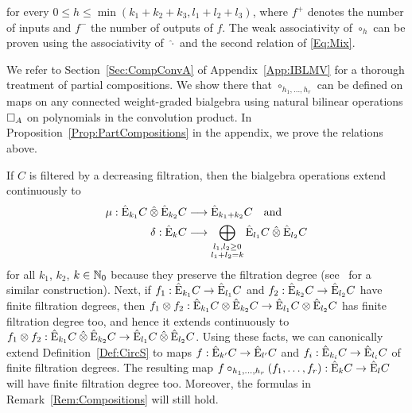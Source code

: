 \documentclass[\MainFolder/Text.tex]{subfiles}
\begin{document}
\begin{Remark}
\begin{RemarkList}
\begin{equation}
\end{equation}
for every $0\le h \le \min(k_1 + k_2 + k_3, l_1 + l_2 + l_3)$, where $f^+$ denotes the number of inputs and $f^-$ the number of outputs of $f$. The weak associativity of $\circ_h$ can be proven using the associativity of $\,\hat{\cdot}$ and the second relation of \eqref{Eq:Mix}.
\item We refer to Section~\ref{Sec:CompConvA} of Appendix~\ref{App:IBLMV} for a thorough treatment of partial compositions. We show there that $\circ_{h_1,\dotsc,h_r}$ can be defined on maps on any connected weight-graded bialgebra using natural bilinear operations $\SquareComp_A$ on polynomials in the convolution product. In Proposition~\ref{Prop:PartCompositions} in the appendix, we prove the relations above.\qedhere
\end{RemarkList}
\end{Remark}

If $C$ is filtered by a decreasing filtration, then the bialgebra operations extend continuously to 
$$\begin{aligned}
\Prod: \hat{\Ext}_{k_1} C \COtimes \hat{\Ext}_{k_2} C &\longrightarrow \hat{\Ext}_{k_1+k_2} C \quad \text{and}\\ 
\CoProd: \hat{\Ext}_k C &\longrightarrow \bigoplus_{\substack{l_1, l_2 \ge 0 \\ l_1 + l_2 = k}} \hat{\Ext}_{l_1}C\COtimes\hat{\Ext}_{l_2}C
\end{aligned}$$ 
for all $k_1$, $k_2$, $k\in \mathbb{N}_0$ because they preserve the filtration degree (see~\cite{Fresse} for a similar construction). Next, if $f_1: \hat{\mathrm{E}}_{k_1}C \rightarrow \hat{\mathrm{E}}_{l_1}C$ and $f_2: \hat{\mathrm{E}}_{k_2}C\rightarrow \hat{\mathrm{E}}_{l_2}C$ have finite filtration degrees, then $f_1 \otimes f_2: \hat{\mathrm{E}}_{k_1} C \otimes \hat{\mathrm{E}}_{k_2} C \rightarrow \hat{\mathrm{E}}_{l_1}C\otimes\hat{\mathrm{E}}_{l_2}C$ has finite filtration degree too, and hence it extends continuously to $f_1 \otimes f_2: \hat{\Ext}_{k_1} C\COtimes \hat{\Ext}_{k_2} C \rightarrow \hat{\Ext}_{l_1}C\COtimes\hat{\Ext}_{l_2}C$.
Using these facts, we can canonically extend Definition~\ref{Def:CircS} to maps $f: \hat{\mathrm{E}}_{k'} C \rightarrow \hat{\mathrm{E}}_{l'} C$ and $f_i: \hat{\mathrm{E}}_{k_i}C \rightarrow \hat{\mathrm{E}}_{l_i}C$ of finite filtration degrees. The resulting map $f\circ_{h_1,\dotsc,h_r}(f_1,\dotsc,f_r): \hat{\mathrm{E}}_k C \rightarrow \hat{\mathrm{E}}_l C$ will have finite filtration degree too. Moreover, the formulas in Remark~\ref{Rem:Compositions} will still hold.%
\end{document}
